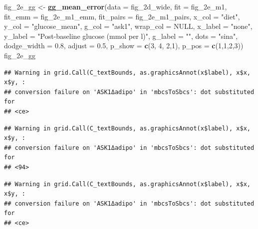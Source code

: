 \documentclass[]{book}
\newenvironment{Shaded}{\begin{snugshade}}{\end{snugshade}}
\newcommand{\DataTypeTok}[1]{\textcolor[rgb]{0.13,0.29,0.53}{#1}}
\newcommand{\DecValTok}[1]{\textcolor[rgb]{0.00,0.00,0.81}{#1}}
\newcommand{\FloatTok}[1]{\textcolor[rgb]{0.00,0.00,0.81}{#1}}
\newcommand{\KeywordTok}[1]{\textcolor[rgb]{0.13,0.29,0.53}{\textbf{#1}}}
\newcommand{\NormalTok}[1]{#1}
\newcommand{\OtherTok}[1]{\textcolor[rgb]{0.56,0.35,0.01}{#1}}
\newcommand{\StringTok}[1]{\textcolor[rgb]{0.31,0.60,0.02}{#1}}
\begin{document}
\begin{Shaded}
\begin{Highlighting}[]
\NormalTok{fig_2e_gg <-}\StringTok{ }\KeywordTok{gg_mean_error}\NormalTok{(}\DataTypeTok{data =}\NormalTok{ fig_2d_wide,}
                          \DataTypeTok{fit =}\NormalTok{ fig_2e_m1,}
                          \DataTypeTok{fit_emm =}\NormalTok{ fig_2e_m1_emm,}
                          \DataTypeTok{fit_pairs =}\NormalTok{ fig_2e_m1_pairs,}
                          \DataTypeTok{x_col =} \StringTok{"diet"}\NormalTok{,}
                          \DataTypeTok{y_col =} \StringTok{"glucose_mean"}\NormalTok{,}
                          \DataTypeTok{g_col =} \StringTok{"ask1"}\NormalTok{,}
                          \DataTypeTok{wrap_col =} \OtherTok{NULL}\NormalTok{,}
                          \DataTypeTok{x_label =} \StringTok{"none"}\NormalTok{,}
                          \DataTypeTok{y_label =} \StringTok{"Post-baseline glucose (mmol per l)"}\NormalTok{,}
                          \DataTypeTok{g_label =} \StringTok{""}\NormalTok{,}
                          \DataTypeTok{dots =} \StringTok{"sina"}\NormalTok{,}
                          \DataTypeTok{dodge_width =} \FloatTok{0.8}\NormalTok{,}
                          \DataTypeTok{adjust =} \FloatTok{0.5}\NormalTok{,}
                          \DataTypeTok{p_show =} \KeywordTok{c}\NormalTok{(}\DecValTok{3}\NormalTok{, }\DecValTok{4}\NormalTok{, }\DecValTok{2}\NormalTok{,}\DecValTok{1}\NormalTok{),}
                          \DataTypeTok{p_pos =} \KeywordTok{c}\NormalTok{(}\DecValTok{1}\NormalTok{,}\DecValTok{1}\NormalTok{,}\DecValTok{2}\NormalTok{,}\DecValTok{3}\NormalTok{))}
\NormalTok{fig_2e_gg}
\end{Highlighting}
\end{Shaded}

\begin{verbatim}
## Warning in grid.Call(C_textBounds, as.graphicsAnnot(x$label), x$x, x$y, :
## conversion failure on 'ASK1Δadipo' in 'mbcsToSbcs': dot substituted for
## <ce>
\end{verbatim}

\begin{verbatim}
## Warning in grid.Call(C_textBounds, as.graphicsAnnot(x$label), x$x, x$y, :
## conversion failure on 'ASK1Δadipo' in 'mbcsToSbcs': dot substituted for
## <94>
\end{verbatim}

\begin{verbatim}
## Warning in grid.Call(C_textBounds, as.graphicsAnnot(x$label), x$x, x$y, :
## conversion failure on 'ASK1Δadipo' in 'mbcsToSbcs': dot substituted for
## <ce>
\end{verbatim}
\end{document}
